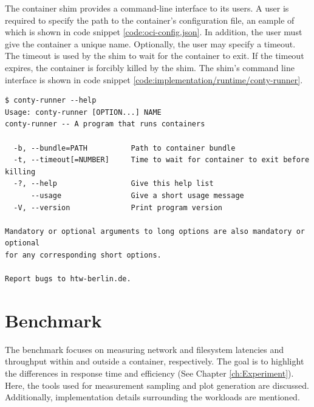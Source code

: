 The container shim provides a command-line interface to its users.
A user is required to specify the path to the container's configuration file, an eample 
of which is shown in code snippet \ref{code:oci-config.json}. In addition, the user must 
give the container a unique name. Optionally, the user may specify a timeout. The timeout is used 
by the shim to wait for the container to exit. If the timeout expires, the container is forcibly 
killed by the shim. The shim's command line interface is shown in code snippet \ref{code:implementation/runtime/conty-runner}.

\begin{lstlisting}[label={code:implementation/runtime/conty-runner}, style=bash, caption={Container shim command-line interface}]
$ conty-runner --help
Usage: conty-runner [OPTION...] NAME
conty-runner -- A program that runs containers

  -b, --bundle=PATH          Path to container bundle
  -t, --timeout[=NUMBER]     Time to wait for container to exit before killing
  -?, --help                 Give this help list
      --usage                Give a short usage message
  -V, --version              Print program version

Mandatory or optional arguments to long options are also mandatory or optional
for any corresponding short options.

Report bugs to htw-berlin.de.
\end{lstlisting}

\section{Benchmark}
The benchmark focuses on measuring network and filesystem latencies and throughput 
within and outside a container, respectively. The goal is to highlight the differences
in response time and efficiency (See Chapter \ref{ch:Experiment}).
Here, the tools used for measurement sampling and plot generation are discussed.
Additionally, implementation details surrounding the workloads are mentioned.

\label{ch:implementation/benchmark}
